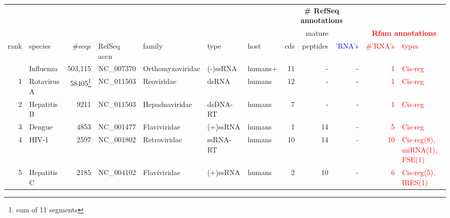 
\begin{table}
\begin{center}
\begin{tabular}{|r|l|r|l|l|l|l||r|r|r||r|l||}
\multicolumn{7}{c}{}                                                                     & \multicolumn{3}{c}{\textbf{\# RefSeq annotations}}    & \multicolumn{2}{c}{}                                            \\ \cline{8-10}
\multicolumn{7}{c||}{}                                                                            &       &   mature &                           & \multicolumn{2}{c}{\textcolor{red}{\textbf{Rfam annotations}}} \\ \cline{1-7} \cline{11-12}
  rank & species            &       \#seqs & RefSeq accn     & family         & type     & host   &   cds & peptides & \textcolor{blue}{'RNA's}   & \textcolor{red}{\#'RNA's} & \textcolor{red}{types} \\ \hline
       & Influenza          &   503,115    & NC\_007370      &Orthomyxoviridae& (-)ssRNA & humans+&    11 &        - & \textcolor{blue}{-}        & \textcolor{red}{1}        & \textcolor{red}{Cis-reg} \\ 
     1 & Rotavirus A        &58405\footnote{sum of 11 segments}& NC\_011503&Reoviridae&dsRNA&humans&   12 &        - & \textcolor{blue}{-}        & \textcolor{red}{1}        & \textcolor{red}{Cis-reg}  \\ %
     2 & Hepatitis B        &         9211 & NC\_011503      & Hepadnaviridae & dsDNA-RT & humans &     7 &        - & \textcolor{blue}{-}        & \textcolor{red}{1}        & \textcolor{red}{Cis-reg} \\ %
     3 & Dengue             &         4853 & NC\_001477      & Flaviviridae   & (+)ssRNA & humans &     1 &       14 & \textcolor{blue}{-}        & \textcolor{red}{5}        & \textcolor{red}{Cis-reg}  \\ 
     4 & HIV-1              &        2597  & NC\_001802      & Retroviridae   & ssRNA-RT & humans &    10 &       14 & \textcolor{blue}{-}        & \textcolor{red}{10}       & \textcolor{red}{Cis-reg(8), miRNA(1), FSE(1)} \\
     5 & Hepatitis C        &        2185  & NC\_004102      & Flaviviridae   & (+)ssRNA & humans &     2 &       10 & \textcolor{blue}{-}        & \textcolor{red}{6}        & \textcolor{red}{Cis-reg(5), IRES(1)} \\

\end{tabular}
\end{center}
\end{table}
